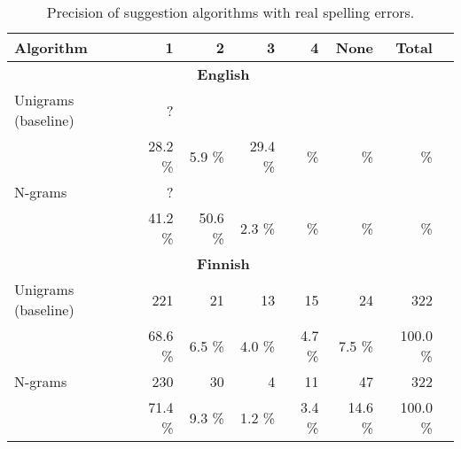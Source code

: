 \documentclass{llncs}
\begin{document}
\begin{table*}
    \caption{Precision of suggestion algorithms with real spelling errors.
    \label{table:real-eval}}
  \begin{center}
      \begin{tabular}{lrrrrrrr}
        \hline
        Algorithm & 1 & 2 & 3 & 4 & None & Total \\
        \hline
        \multicolumn{7}{c}{\textbf{English}} \\
        \hline
        Unigrams         (baseline) 
&    ?   &       &      &      &       &     \\
& 28.2 \% & 5.9 \% & 29.4 \% &     \% &     \%  &       \% \\
        \hline
        N-grams 
&     ?  &       &      &      &       &     \\
& 41.2 \% & 50.6 \% & 2.3 \% &     \% &      \% &       \% \\
\hline
        \multicolumn{7}{c}{\textbf{Finnish}} \\
        \hline
        Unigrams          (baseline) 
& 221    & 21    & 13    & 15    & 24    & 322 \\
& 68.6 \% & 6.5 \% & 4.0 \% & 4.7 \% & 7.5 \% & 100.0 \% \\

        \hline
        N-grams
& 230    & 30    & 4    & 11    & 47    & 322 \\
& 71.4 \% & 9.3 \% & 1.2 \% & 3.4 \% & 14.6 \% & 100.0 \% \\
        \hline
      \end{tabular}
  \end{center}
\end{table*}
\end{document}
